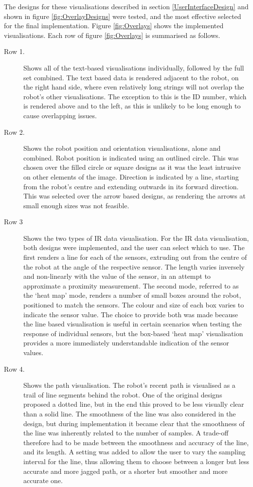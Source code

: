The designs for these visualisations described in section \ref{UserInterfaceDesign} and shown in figure \ref{fig:OverlayDesigns} were tested, and the most effective selected for the final implementation. Figure \ref{fig:Overlays} shows the implemented visualisations. Each row of figure \ref{fig:Overlays} is summarised as follows.

\begin{description}
\item [Row 1.] Shows all of the text-based visualisations individually, followed by the full set combined. The text based data is rendered adjacent to the robot, on the right hand side, where even relatively long strings will not overlap the robot's other visualisations. The exception to this is the ID number, which is rendered above and to the left, as this is unlikely to be long enough to cause overlapping issues.  

\item [Row 2.] Shows the robot position and orientation visualisations, alone and combined. Robot position is indicated using an outlined circle. This was chosen over the filled circle or square designs as it was the least intrusive on other elements of the image. Direction is indicated by a line, starting from the robot's centre and extending outwards in its forward direction. This was selected over the arrow based designs, as rendering the arrows at small enough sizes was not feasible.

\item [Row 3] Shows the two types of IR data visualisation. For the IR data visualisation, both designs were implemented, and the user can select which to use. The first renders a line for each of the sensors, extruding out from the centre of the robot at the angle of the respective sensor. The length varies inversely and non-linearly with the value of the sensor, in an attempt to approximate a proximity measurement. The second mode, referred to as the `heat map' mode, renders a number of small boxes around the robot, positioned to match the sensors. The colour and size of each box varies to indicate the sensor value. The choice to provide both was made because the line based visualisation is useful in certain scenarios when testing the response of individual sensors, but the box-based `heat map' visualisation provides a more immediately understandable indication of the sensor values.  

\item [Row 4.] Shows the path visualisation. The robot's recent path is visualised as a trail of line segments behind the robot. One of the original designs proposed a dotted line, but in the end this proved to be less visually clear than a solid line. The smoothness of the line was also considered in the design, but during implementation it became clear that the smoothness of the line was inherently related to the number of samples. A trade-off therefore had to be made between the smoothness and accuracy of the line, and its length. A setting was added to allow the user to vary the sampling interval for the line, thus allowing them to choose between a longer but less accurate and more jagged path, or a shorter but smoother and more accurate one.


\end{description}
